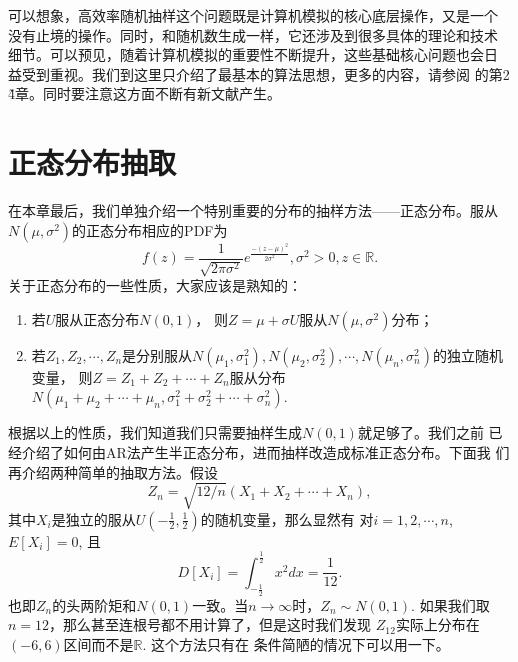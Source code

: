 可以想象，高效率随机抽样这个问题既是计算机模拟的核心底层操作，又是一个
没有止境的操作。同时，和随机数生成一样，它还涉及到很多具体的理论和技术
细节。可以预见，随着计算机模拟的重要性不断提升，这些基础核心问题也会日
益受到重视。我们到这里只介绍了最基本的算法思想，更多的内容，请参阅
\cite{Fishman1995Monte}的第2 \~ 4章。同时要注意这方面不断有新文献产生。

\section{正态分布抽取}
在本章最后，我们单独介绍一个特别重要的分布的抽样方法——正态分布。服从
$N(\mu, \sigma^2)$的正态分布相应的PDF为
\begin{equation}
  f(z) = \frac{1}{\sqrt{2\pi \sigma^2}} e^{\frac{-(z -
      \mu)^2}{2\sigma^2}}, \sigma^2 > 0, z \in \mathbb{R}.
\end{equation}
关于正态分布的一些性质，大家应该是熟知的：
\begin{enumerate}
\item 若$U$服从正态分布$N(0, 1)$，
  则$Z = \mu + \sigma U$服从$N(\mu, \sigma^2)$分布；
\item 若$Z_1, Z_2, \cdots, Z_n$是分别服从$N(\mu_1, \sigma_1^2),
  N(\mu_2, \sigma_2^2), \cdots, N(\mu_n, \sigma_n^2)$的独立随机变量，
  则$Z = Z_1 + Z_2 + \cdots + Z_n$服从分布$N(\mu_1 + \mu_2 +
  \cdots + \mu_n, \sigma_1^2 + \sigma_2^2 + \cdots + \sigma_n^2)$.
\end{enumerate}
根据以上的性质，我们知道我们只需要抽样生成$N(0, 1)$就足够了。我们之前
已经介绍了如何由AR法产生半正态分布，进而抽样改造成标准正态分布。下面我
们再介绍两种简单的抽取方法。假设
\begin{equation}
  Z_n = \sqrt{12/n}(X_1 + X_2 + \cdots + X_n),
  \label{eq::normal_naive}
\end{equation}
其中$X_i$是独立的服从$U(-\frac{1}{2}, \frac{1}{2})$的随机变量，那么显然有
对$i = 1, 2, \cdots, n$, $E[X_i] = 0$, 且
$$
D[X_i] = \int_{-\frac{1}{2}}^{\frac{1}{2}}x^2 dx = \frac{1}{12}.
$$
也即$Z_n$的头两阶矩和$N(0, 1)$一致。当$n \to \infty$时，$Z_n \sim N(0,
1)$. 如果我们取$n = 12$，那么甚至连根号都不用计算了，但是这时我们发现
$Z_{12}$实际上分布在$(-6, 6)$区间而不是$\mathbb{R}$. 这个方法只有在
条件简陋的情况下可以用一下。

